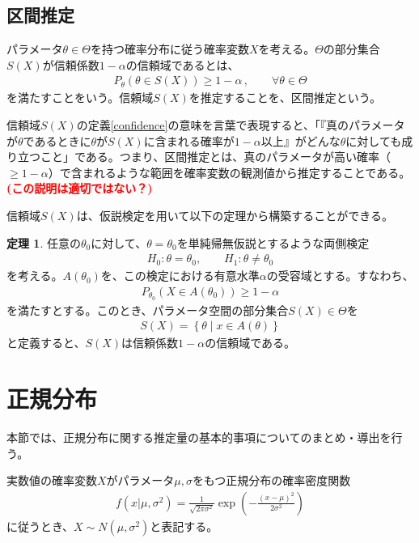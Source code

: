 \documentclass[11pt]{ltjsarticle}
\theoremstyle{definition}
\newtheorem{theorem}{定理}[section]
\newcommand{\cmt}[1]{\textcolor{red}{\textbf{(#1)}}}
\begin{document}
\subsection{区間推定}
パラメータ$\theta\in\Theta$を持つ確率分布に従う確率変数$X$を考える。$\Theta$の部分集合$S(X)$が信頼係数$1-\alpha$の信頼域であるとは、
\begin{align}\label{confidence}
    P_\theta(\theta\in S(X))\ge 1-\alpha\,,\qquad \forall\theta\in\Theta
\end{align}
を満たすことをいう。信頼域$S(X)$を推定することを、区間推定という。

信頼域$S(X)$の定義\eqref{confidence}の意味を言葉で表現すると、「『真のパラメータが$\theta$であるときに$\theta$が$S(X)$に含まれる確率が$1-\alpha$以上』がどんな$\theta$に対しても成り立つこと」である。つまり、区間推定とは、真のパラメータが高い確率（$\ge 1-\alpha$）で含まれるような範囲を確率変数の観測値から推定することである。\cmt{この説明は適切ではない？}

信頼域$S(X)$は、仮説検定を用いて以下の定理から構築することができる。
\begin{theorem}\label{th:confidenceregion}
    任意の$\theta_0$に対して、$\theta = \theta_0$を単純帰無仮説とするような両側検定
    \begin{align}
            H_0: \theta=\theta_0,\qquad H_1: \theta\neq \theta_0
    \end{align}
    を考える。$A(\theta_0)$を、この検定における有意水準$\alpha$の受容域とする。すなわち、
    \begin{align}
        P_{\theta_0}(X\in A(\theta_0))\ge 1-\alpha
    \end{align}
    を満たすとする。このとき、パラメータ空間の部分集合$S(X)\in\Theta$を
    \begin{align}
        S(X) = \left\{\theta\mid x\in A(\theta)\right\}
    \end{align}
    と定義すると、$S(X)$は信頼係数$1-\alpha$の信頼域である。
\end{theorem}


\section{正規分布}
本節では、正規分布に関する推定量の基本的事項についてのまとめ・導出を行う。

実数値の確率変数$X$がパラメータ$\mu, \sigma$をもつ正規分布の確率密度関数
\begin{align}
    f(x|\mu, \sigma^2) = \frac{1}{\sqrt{2\pi \sigma^2}}\exp\left(-\frac{(x - \mu)^2}{2\sigma^2}\right)
\end{align}
に従うとき、$X\sim N(\mu, \sigma^2)$と表記する。
\end{document}
